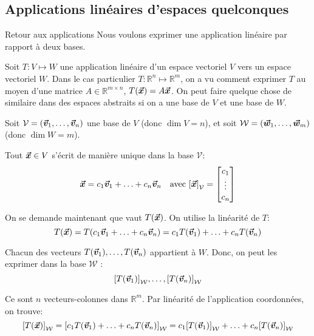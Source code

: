 \documentclass[a4paper]{article}
\begin{document}
\subsection{Applications linéaires d'espaces quelconques}
\begin{parag}{Retour aux applications}
    Nous voulons exprimer une application linéaire par rapport à deux bases.

    Soit $T : V \mapsto W$ une application linéaire d'un espace vectoriel $V$ vers un espace vectoriel $W$. Dans le cas particulier $T : \mathbb{R}^n \mapsto \mathbb{R}^m$, on a vu comment exprimer $T$ au moyen d'une matrice $A \in \mathbb{R}^{m \times n}$, $T\left(\bvec{x}\right) = A \bvec{x}$. On peut faire quelque chose de similaire dans des espaces abstraits si on a une base de $V$ et une base de $W$.

    Soit $\mathcal{V} = \left(\bvec{v}_1, \ldots, \bvec{v}_n\right)$ une base de $V$ (donc $\dim V = n$), et soit $\mathcal{W} = \left(\bvec{w}_1, \ldots, \bvec{w}_m\right)$ (donc $\dim W = m$).

    Tout $\bm{\protect\vec{x}} \in V$ s'écrit de manière unique dans la base $\mathcal{V}$:
    \[\bvec{x} = c_1 \bvec{v}_1 + \ldots + c_n \bvec{v}_n \mathspace \text{avec } \left[\bvec{x}\right]_{\mathcal{V}} = \begin{bmatrix} c_1 \\ \vdots \\ c_n \end{bmatrix} \]

    On se demande maintenant que vaut $T\left(\bvec{x}\right)$. On utilise la linéarité de $T$:
    \[T\left(\bvec{x}\right) = T\left(c_1 \bvec{v}_1 + \ldots + c_n \bvec{v}_n\right) = c_1 T\left(\bvec{v}_1\right) + \ldots + c_n  T\left(\bvec{v}_n\right)\]

    Chacun des vecteurs $T\left(\bvec{v}_1\right), \ldots, T\left(\bvec{v}_n\right)$ appartient à $W$. Donc, on peut les exprimer dans la base $\mathcal{W}$ :
    \[\left[T\left(\bvec{v}_1\right)\right]_{\mathcal{W}}, \ldots, \left[T\left(\bvec{v}_n\right)\right]_{\mathcal{W}}\]

    Ce sont $n$ vecteurs-colonnes dans $\mathbb{R}^{m}$. Par linéarité de l'application coordonnées, on trouve:
    \[\left[T\left(\bvec{x}\right)\right]_{\mathcal{W}} = \left[c_1 T\left(\bvec{v}_1\right) + \ldots + c_n T\left(\bvec{v}_n\right)\right]_{\mathcal{W}} = c_1 \left[T\left(\bvec{v}_1\right)\right]_{\mathcal{W}} + \ldots + c_n\left[T\left(\bvec{v}_n\right)\right]_{\mathcal{W}}\]


\end{parag}
\end{document}
